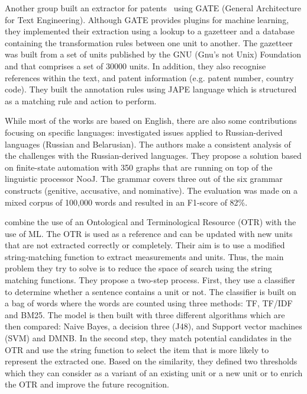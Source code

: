 Another group built an extractor for patents~\cite{agatonovic2008large} using GATE (General Architecture for Text Engineering). 
Although GATE provides plugins for machine learning, they implemented their extraction using a lookup to a gazetteer and a database containing the transformation rules between one unit to another. 
The gazetteer was built from a set of units published by the GNU (Gnu's not Unix) Foundation and that comprises a set of 30000 units. In addition, they also recognise references within the text, and patent information (e.g. patent number, country code). 
They built the annotation rules using JAPE language which is structured as a matching rule and action to perform. 

While most of the works are based on English, there are also some contributions focusing on specific languages: \cite{hetsevich2014processing} investigated issues applied to Russian-derived languages (Russian and Belarusian). 
The authors make a consistent analysis of the challenges with the Russian-derived languages. 
They propose a solution based on finite-state automation with 350 graphs that are running on top of the linguistic processor NooJ. 
The grammar covers three out of the six grammar constructs (genitive, accusative, and nominative). 
The evaluation was made on a mixed corpus of 100,000 words and resulted in an F1-score of 82\%. 

\cite{berrahou2013extract} combine the use of an Ontological and
Terminological Resource (OTR) with the use of ML.
The OTR is used as a reference and can be updated with new units that are not extracted correctly or completely. 
Their aim is to use a modified string-matching function to extract measurements and units. Thus, the main problem they try to solve is to  reduce the space of search using the string matching functions. 
They propose a two-step process. 
First, they use a classifier to determine whether a sentence contains a unit or not. The classifier is built on a bag of words where the words are counted using three methods: TF, TF/IDF and BM25. The model is then built with three different algorithms which are then compared: Naive Bayes, a decision three (J48), and Support vector machines (SVM) and DMNB.
In the second step, they match potential candidates in the OTR and use the string function to select the item that is more likely to represent the extracted one. Based on the similarity, they defined two thresholds which they can consider as a variant of an existing unit or a new unit or to enrich the OTR and improve the future recognition.


